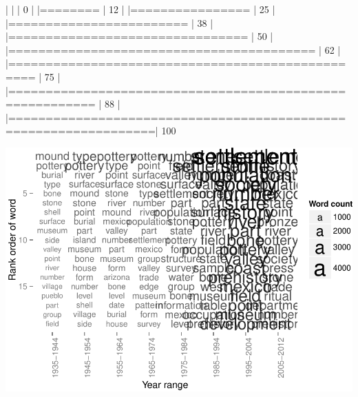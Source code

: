 \documentclass[10pt]{article}
\newenvironment{CodeChunk}{}{}
\begin{document}
\begin{CodeChunk}
\begin{CodeChunk}
\begin{CodeOutput}
  |                                                                       
  |                                                                 |   0%
  |                                                                       
  |========                                                         |  12%
  |                                                                       
  |================                                                 |  25%
  |                                                                       
  |========================                                         |  38%
  |                                                                       
  |================================                                 |  50%
  |                                                                       
  |=========================================                        |  62%
  |                                                                       
  |=================================================                |  75%
  |                                                                       
  |=========================================================        |  88%
  |                                                                       
  |=================================================================| 100%
\end{CodeOutput}

\includegraphics{509Assignment_files/figure-latex/onegram4-2} \end{CodeChunk}
\end{document}
